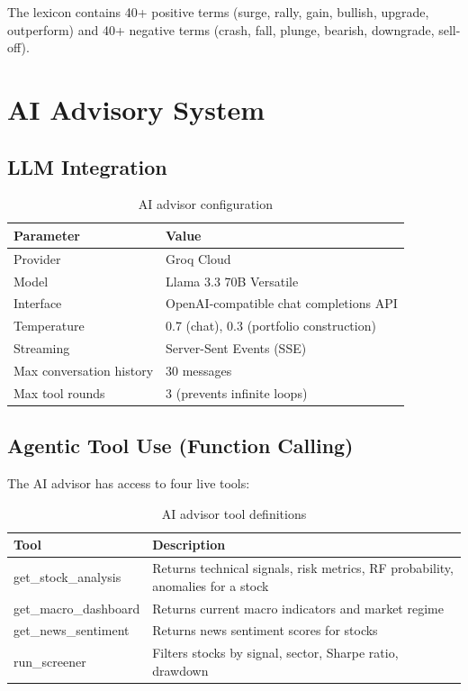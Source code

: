 \documentclass[12pt, a4paper, oneside]{report}
\begin{document}
The lexicon contains 40+ positive terms (surge, rally, gain, bullish, upgrade, outperform) and 40+ negative terms (crash, fall, plunge, bearish, downgrade, sell-off).

\section{AI Advisory System}
\label{sec:meth_ai}

\subsection{LLM Integration}

\begin{table}[H]
\centering
\caption{AI advisor configuration}
\label{tab:ai_config}
\begin{tabularx}{\textwidth}{@{}l X@{}}
\toprule
\textbf{Parameter} & \textbf{Value} \\
\midrule
Provider & Groq Cloud \\
Model & Llama 3.3 70B Versatile \\
Interface & OpenAI-compatible chat completions API \\
Temperature & 0.7 (chat), 0.3 (portfolio construction) \\
Streaming & Server-Sent Events (SSE) \\
Max conversation history & 30 messages \\
Max tool rounds & 3 (prevents infinite loops) \\
\bottomrule
\end{tabularx}
\end{table}

\subsection{Agentic Tool Use (Function Calling)}

The AI advisor has access to four live tools:

\begin{table}[H]
\centering
\caption{AI advisor tool definitions}
\label{tab:ai_tools}
\begin{tabularx}{\textwidth}{@{}l X@{}}
\toprule
\textbf{Tool} & \textbf{Description} \\
\midrule
get\_stock\_analysis & Returns technical signals, risk metrics, RF probability, anomalies for a stock \\
get\_macro\_dashboard & Returns current macro indicators and market regime \\
get\_news\_sentiment & Returns news sentiment scores for stocks \\
run\_screener & Filters stocks by signal, sector, Sharpe ratio, drawdown \\
\bottomrule
\end{tabularx}
\end{table}
\end{document}
